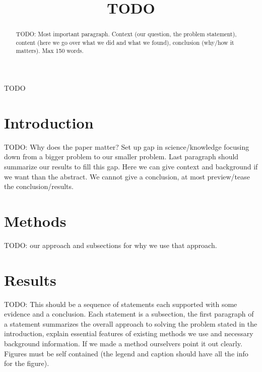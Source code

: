 \documentclass[conference]{IEEEtran}
\begin{document}
\title{TODO}

\author{
\and
{}
\and
{}
\and
{}
}

\maketitle

\begin{abstract}
TODO: Most important paragraph. Context (our question, the problem statement), content (here we go 
over what we did and what we found), conclusion (why/how it matters). Max 150 words.
\end{abstract}

\begin{IEEEkeywords}
TODO
\end{IEEEkeywords}

\section{Introduction}
TODO: Why does the paper matter? Set up gap in science/knowledge focusing down from a bigger 
problem to our smaller problem. Last paragraph should summarize our results to fill this gap. Here 
we can give context and background if we want than the abstract. We cannot give a conclusion, at 
most preview/tease the conclusion/results.

\section{Methods}
TODO: our approach and subsections for why we use that approach.

\section{Results}
TODO: This should be a sequence of statements each supported with some evidence and a conclusion.
Each statement is a subsection, the first paragraph of a statement summarizes the overall approach 
to solving the problem stated in the introduction, explain essential features of existing methods
we use and necessary background information. If we made a method ourselvers point it out clearly. 
Figures must be self contained (the legend and caption should have all the info for the figure).
\end{document}
